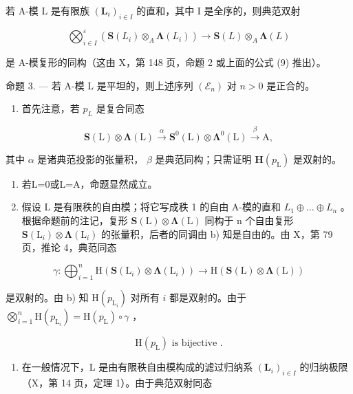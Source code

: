 若 A-模 L 是有限族 \((\mathbf{L}_{i})_{i\in I}\) 的直和，其中 I 是全序的，则典范双射

\[
\bigotimes_ {i \in I} ^ {\varepsilon} \left(\mathbf {S} (L _ {i}) \otimes_ {A} \boldsymbol {\Lambda} (L _ {i})\right) \to \mathbf {S} (L) \otimes_ {A} \boldsymbol {\Lambda} (L)
\]

是 A-模复形的同构（这由 X，第 148 页，命题 2 或上面的公式 (9) 推出）。

命题 3. --- 若 A-模 L 是平坦的，则上述序列 \((\mathcal{E}_n)\) 对 \(n > 0\) 是正合的。

\begin{enumerate}
\def\labelenumi{\alph{enumi})}
\tightlist
\item
  首先注意，若 \(p_{L}\) 是复合同态
\end{enumerate}

\[
\mathbf {S} (\mathrm{L}) \otimes \boldsymbol {\Lambda} (\mathrm{L}) \xrightarrow {\alpha} \mathbf {S} ^ {0} (\mathrm{L}) \otimes \boldsymbol {\Lambda} ^ {0} (\mathrm{L}) \xrightarrow {\beta} \mathrm{A},
\]

其中 \(\alpha\) 是诸典范投影的张量积， \(\beta\) 是典范同构；只需证明 \(\mathbf{H}(p_{\mathrm{L}})\) 是双射的。

\begin{enumerate}
\def\labelenumi{\alph{enumi})}
\setcounter{enumi}{1}
\item
  若L=0或L=A，命题显然成立。
\item
  假设 L 是有限秩的自由模；将它写成秩 1 的自由 A-模的直和 \(L_{1} \oplus \ldots \oplus L_{n}\) 。根据命题前的注记，复形 \(\mathbf{S}(\mathrm{L}) \otimes \symbf{\Lambda}(\mathrm{L})\) 同构于 n 个自由复形 \(\mathbf{S}(\mathrm{L}_{i}) \otimes \symbf{\Lambda}(\mathrm{L}_{i})\) 的张量积，后者的同调由 b) 知是自由的。由 X，第 79 页，推论 4，典范同态
\end{enumerate}

\[
\gamma : \bigoplus_ {i = 1} ^ {n} \mathrm{H} (\mathbf {S} (\mathrm{L} _ {i}) \otimes \boldsymbol {\Lambda} (\mathrm{L} _ {i})) \rightarrow \mathrm{H} (\mathbf {S} (\mathrm{L}) \otimes \boldsymbol {\Lambda} (\mathrm{L}))
\]

是双射的。由 b) 知 \(\mathrm{H}(p_{\mathrm{L}_i})\) 对所有 \(i\) 都是双射的。由于 \(\bigotimes_{i=1}^{n} \mathrm{H}(p_{\mathrm{L}_i}) = \mathrm{H}(p_{\mathrm{L}}) \circ \gamma\) ，

\[
\mathrm{H} (p _ {\mathrm{L}}) \text {   is   bijective }  .
\]

\begin{enumerate}
\def\labelenumi{\alph{enumi})}
\setcounter{enumi}{3}
\tightlist
\item
  在一般情况下，L 是由有限秩自由模构成的滤过归纳系 \((\mathbf{L}_{i})_{i\in I}\) 的归纳极限（X，第 14 页，定理 1）。由于典范双射同态
\end{enumerate}

